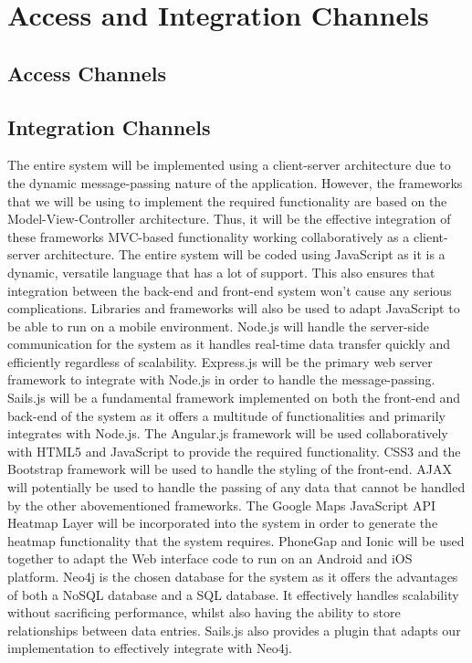 \documentclass[11pt,fleqn]{book} %
\begin{document}
	\chapter{Access and Integration Channels}
	
	\section{Access Channels}
	\section{Integration Channels}
	The entire system will be implemented using a client-server architecture due to the dynamic message-passing nature of the application. However, the frameworks that we will be using to implement the required functionality are based on the Model-View-Controller architecture. Thus, it will be the effective integration of these frameworks MVC-based functionality working collaboratively as a client-server architecture. The entire system will be coded using JavaScript as it is a dynamic, versatile language that has a lot of support. This also ensures that integration between the back-end and front-end system won’t cause any serious complications. Libraries and frameworks will also be used to adapt JavaScript to be able to run on a mobile environment.\newline\newline
	Node.js will handle the server-side communication for the system as it handles real-time data transfer quickly and efficiently regardless of scalability. Express.js will be the primary web server framework to integrate with Node.js in order to handle the message-passing. Sails.js will be a fundamental framework implemented on both the front-end and back-end of the system as it offers a multitude of functionalities and primarily integrates with Node.js. The Angular.js framework will be used collaboratively with HTML5 and JavaScript to provide the required functionality. CSS3 and the Bootstrap framework will be used to handle the styling of the front-end. AJAX will potentially be used to handle the passing of any data that cannot be handled by the other abovementioned frameworks. The Google Maps JavaScript API Heatmap Layer will be incorporated into the system in order to generate the heatmap functionality that the system requires. PhoneGap and Ionic will be used together to adapt the Web interface code to run on an Android  and iOS platform.\newline\newline
	Neo4j is the chosen database for the system as it offers the advantages of both a NoSQL database and a SQL database. It effectively handles scalability without sacrificing performance, whilst also having the ability to store relationships between data entries. Sails.js also provides a plugin that adapts our implementation to effectively integrate with Neo4j.
	
\end{document}
